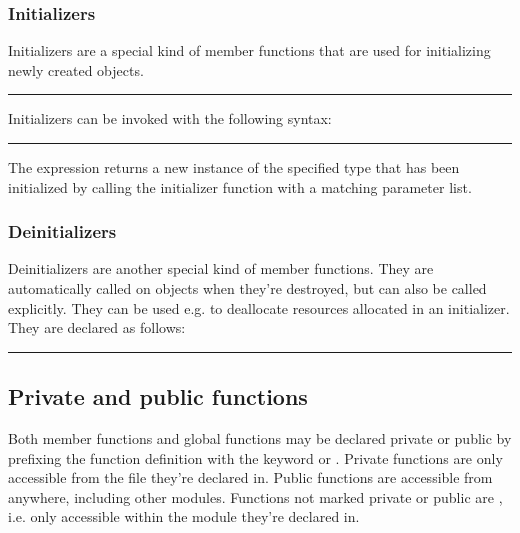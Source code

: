 \subsubsection{Initializers}

Initializers are a special kind of member functions that are used for
initializing newly created objects.

\begin{grammar}
\rule{initializer-definition}  \code{(}  \code{)} \code{\{}  \code{\}}
\end{grammar}

Initializers can be invoked with the following syntax:

\begin{grammar}
\rule{initializer-call}  \code{(}  \code{)}
\end{grammar}

The  expression returns a new instance of the
specified type that has been initialized by calling the initializer function
with a matching parameter list.

\subsubsection{Deinitializers}

Deinitializers are another special kind of member functions. They are
automatically called on objects when they're destroyed, but can also be called
explicitly. They can be used e.g. to deallocate resources allocated in an
initializer. They are declared as follows:

\begin{grammar}
\rule{deinitializer-definition}  \code{(} \code{)} \code{\{}  \code{\}}
\end{grammar}

\subsection{Private and public functions}

Both member functions and global functions may be declared private or public by
prefixing the function definition with the keyword  or
. Private functions are only accessible from the file they're
declared in. Public functions are accessible from anywhere, including other
modules. Functions not marked private or public are
, i.e. only accessible within the module they're
declared in.

